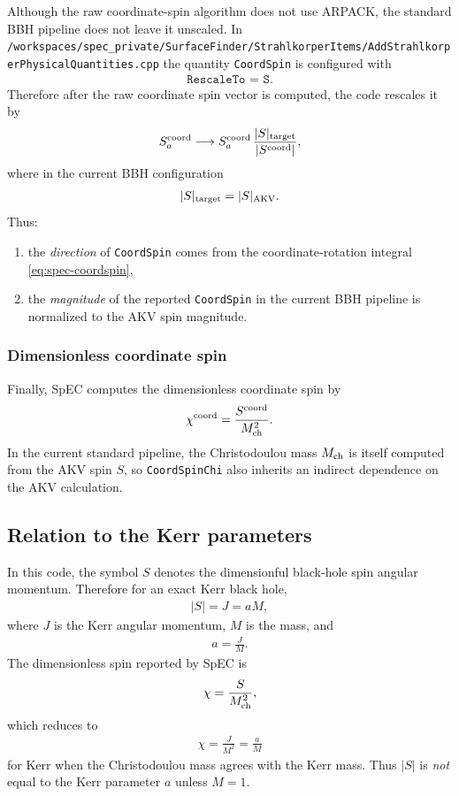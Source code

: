 Although the raw coordinate-spin algorithm does not use ARPACK, the standard BBH pipeline does not leave it unscaled.  In
\texttt{/workspaces/spec\_private/SurfaceFinder/StrahlkorperItems/AddStrahlkorperPhysicalQuantities.cpp}
the quantity \texttt{CoordSpin} is configured with
\begin{align}
\texttt{RescaleTo = S}.
\end{align}
Therefore after the raw coordinate spin vector is computed, the code rescales it by
\begin{align}
S^{\rm coord}_a \longrightarrow
S^{\rm coord}_a\,
\frac{|S|_{\rm target}}{|S^{\rm coord}|},
\end{align}
where in the current BBH configuration
\begin{align}
|S|_{\rm target} = |S|_{\rm AKV}.
\end{align}
Thus:
\begin{enumerate}
\item the \emph{direction} of \texttt{CoordSpin} comes from the coordinate-rotation integral \eqref{eq:spec-coordspin},
\item the \emph{magnitude} of the reported \texttt{CoordSpin} in the current BBH pipeline is normalized to the AKV spin magnitude.
\end{enumerate}

\subsubsection{Dimensionless coordinate spin}

Finally, SpEC computes the dimensionless coordinate spin by
\begin{align}
\chi^{\rm coord} = \frac{S^{\rm coord}}{M_{\rm ch}^2}.
\end{align}
In the current standard pipeline, the Christodoulou mass $M_{\rm ch}$ is itself computed from the AKV spin $S$, so \texttt{CoordSpinChi} also inherits an indirect dependence on the AKV calculation.

\subsection{Relation to the Kerr parameters}

In this code, the symbol $S$ denotes the dimensionful black-hole spin angular momentum.  Therefore for an exact Kerr black hole,
\begin{align}
|S| = J = a M,
\end{align}
where $J$ is the Kerr angular momentum, $M$ is the mass, and
\begin{align}
a = \frac{J}{M}.
\end{align}
The dimensionless spin reported by SpEC is
\begin{align}
\chi = \frac{S}{M_{\rm ch}^2},
\end{align}
which reduces to
\begin{align}
\chi = \frac{J}{M^2} = \frac{a}{M}
\end{align}
for Kerr when the Christodoulou mass agrees with the Kerr mass.  Thus $|S|$ is \emph{not} equal to the Kerr parameter $a$ unless $M=1$.
